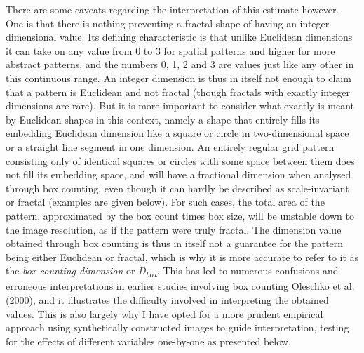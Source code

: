 \documentclass[
  12pt,
]{book}
\begin{document}
There are some caveats regarding the interpretation of this estimate however. One is that there is nothing preventing a fractal shape of having an integer dimensional value. Its defining characteristic is that unlike Euclidean dimensions it can take on any value from 0 to 3 for spatial patterns and higher for more abstract patterns, and the numbers 0, 1, 2 and 3 are values just like any other in this continuous range. An integer dimension is thus in itself not enough to claim that a pattern is Euclidean and not fractal (though fractals with exactly integer dimensions are rare). But it is more important to consider what exactly is meant by Euclidean shapes in this context, namely a shape that entirely fills its embedding Euclidean dimension like a square or circle in two-dimensional space or a straight line segment in one dimension. An entirely regular grid pattern consisting only of identical squares or circles with some space between them does not fill its embedding space, and will have a fractional dimension when analysed through box counting, even though it can hardly be described as scale-invariant or fractal (examples are given below). For such cases, the total area of the pattern, approximated by the box count times box size, will be unstable down to the image resolution, as if the pattern were truly fractal. The dimension value obtained through box counting is thus in itself not a guarantee for the pattern being either Euclidean or fractal, which is why it is more accurate to refer to it as the \emph{box-counting dimension} or \emph{D\textsubscript{box}}. This has led to numerous confusions and erroneous interpretations in earlier studies involving box counting Oleschko et al. (2000), and it illustrates the difficulty involved in interpreting the obtained values. This is also largely why I have opted for a more prudent empirical approach using synthetically constructed images to guide interpretation, testing for the effects of different variables one-by-one as presented below.
\end{document}
